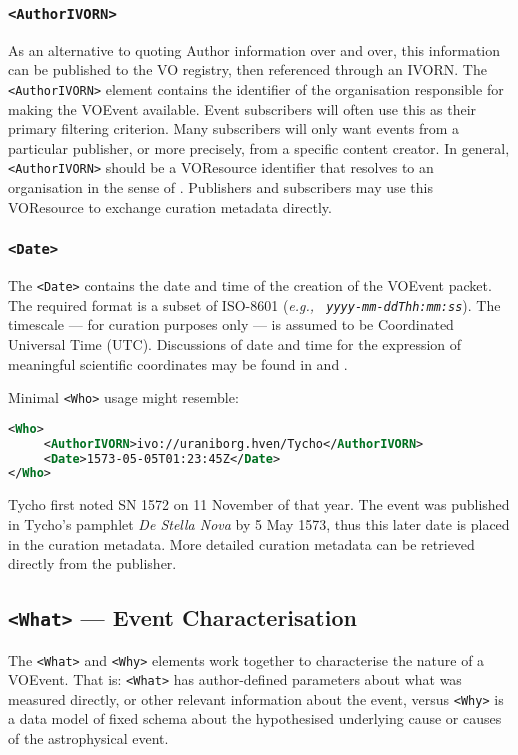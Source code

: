 \documentclass[11pt,a4paper]{ivoa}
\begin{document}
\subsubsection{\texttt{<AuthorIVORN>}}
As an alternative to quoting Author information over and over, this information 
can be published to the VO registry, then referenced through an IVORN. The \texttt{
<AuthorIVORN>} element contains the identifier of the organisation responsible 
for making the VOEvent available. Event subscribers will often use this as their 
primary filtering criterion. Many subscribers will only want events from a 
particular publisher, or more precisely, from a specific content creator. In 
general, \texttt{<AuthorIVORN>} should be a VOResource identifier that resolves to 
an organisation in the sense of \citep{2007ivoa.spec.0302H}. Publishers and 
subscribers may use this VOResource to exchange curation metadata directly. 

\subsubsection{\texttt{<Date>}}
The \texttt{<Date>} contains the date and time of the creation of the VOEvent 
packet. The required format is a subset of ISO-8601 (\emph{e.g., \texttt{
yyyy-mm-ddThh:mm:ss}}). The timescale --- for curation purposes only --- is 
assumed to be Coordinated Universal Time (UTC). Discussions of date and time for 
the expression of meaningful scientific coordinates may be found in 
\citep{2007ivoa.spec.1030R} and \citep{bib26}. 


Minimal \texttt{<Who>} usage might resemble: 
\begin{lstlisting}[language=XML]
<Who>
     <AuthorIVORN>ivo://uraniborg.hven/Tycho</AuthorIVORN>
     <Date>1573-05-05T01:23:45Z</Date>
</Who>
\end{lstlisting}
Tycho first noted SN 1572 on 11 November of that year. The event was published
in Tycho's pamphlet \emph{De Stella Nova} by 5 May 1573, thus this later date is
placed in the curation metadata. More detailed curation metadata can be
retrieved directly from the publisher.


\subsection{\texttt{<What>} --- Event Characterisation}
\label{sec:3.3}
The \texttt{<What>} and \texttt{<Why>} elements work together to characterise the 
nature of a VOEvent. That is: \texttt{<What>} has author-defined parameters about 
what was measured directly, or other relevant information about the event, 
versus \texttt{<Why>} is a data model of fixed schema about the hypothesised 
underlying cause or causes of the astrophysical event. 
\end{document}
